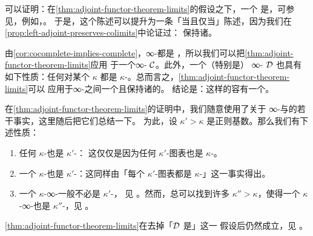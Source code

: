 \begin{remark}\label{rem:right-adjoint-accessible}
可以证明：在\cref{thm:adjoint-functor-theorem-limits}的假设之下，一个%
\trRightAdjoint{}是\trAccessible{}，可参见，例如，\cite[Theorem 4.1.4 (1)]{NRS19}。
于是，这个陈述可以提升为一条「当且仅当」陈述，因为我们在\cref{prop:left-adjoint-preserves-colimits}中论证过：
\trRightAdjoint{}保持诸\trLimit{}。
\end{remark}

\begin{remark}\label{rem:aft-limits-presentable}
由\cref{cor:cocomplete-implies-complete}，\trPresentable{}∞-\trCategories{}都是%
\trComplete{}，所以我们可以把\cref{thm:adjoint-functor-theorem-limits}应用
于一个\trPresentable{}∞-\trCategory{} $\mathcal{C}$。此外，一个\trAccessible{}（特别是\trPresentable{}）%
∞-\trCategory{} $\mathcal{D}$ 也具有如下性质：任何\trObject{}对某个 $\kappa$ 都是
$\kappa$-\trCompact{}。总而言之，\cref{thm:adjoint-functor-theorem-limits}可以
应用于\trPresentable{}∞-\trCategories{}之间一个\trAccessible{}且保持诸\trLimit{}的\trFunctor{}。
结论是：这样的\trFunctor{}容有一个\trLeftAdjoint{}。
\end{remark}

\begin{remark}\label{rem:cardinal-facts}
在\cref{thm:adjoint-functor-theorem-limits}的证明中，我们随意使用了关于%
\trAccessible{}%
∞-\trCategories{}与\trCompact{}\trObject{}的若干事实，这里随后把它们总结一下。
为此，设 $\kappa' > \kappa$ 是正则基数。那么我们有下述性质：
\begin{enumerate}[label=(\arabic*)]
  \item 任何 $\kappa$-\trCompact{}\trObject{}也是 $\kappa'$-\trCompact{}：
        这仅仅是因为任何 $\kappa'$-\trFiltered{}图表也是 $\kappa$-\trFiltered{}。
  \item 一个 $\kappa$-\trAccessible{}\trFunctor{}也是 $\kappa'$-\trAccessible{}：这同样由「每个
        $\kappa'$-\trFiltered{}图表都是 $\kappa$-\trFiltered{}」这一事实得出。
  \item 一个 $\kappa$-\trAccessible{}∞-\trCategory{}一般不必是 $\kappa'$-\trAccessible{}，
        见 \cite[Remark 5.4.2.12]{Lur09}。然而，总可以找到许多
        $\kappa'' > \kappa$，使得一个 $\kappa$-\trAccessible{}∞-\trCategory{}也是
        $\kappa''$-\trAccessible{}，见 \cite[Proposition 5.4.2.11]{Lur09}。
\end{enumerate}
\end{remark}

\begin{remark}\label{rem:no-completeness-assumption}
\cref{thm:adjoint-functor-theorem-limits}在去掉「$\mathcal{D}$ 是\trComplete{}」这一
假设后仍然成立，见 \cite[proof of Theorem 4.1.1 (2)]{NRS19}。
\end{remark}

